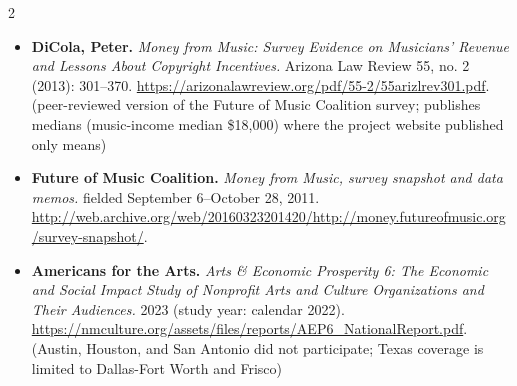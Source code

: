 {\begin{multicols}{2}
\begin{itemize}[itemsep=0pt,topsep=1pt,parsep=0pt,partopsep=0pt,leftmargin=1em]
\item \textbf{DiCola, Peter.} \textit{Money from Music: Survey Evidence on Musicians’ Revenue and Lessons About Copyright Incentives.} Arizona Law Review 55, no. 2 (2013): 301--370. \url{https://arizonalawreview.org/pdf/55-2/55arizlrev301.pdf}. {\color{ammuted}(peer-reviewed version of the Future of Music Coalition survey; publishes medians (music-income median \$18,000) where the project website published only means)}
\item \textbf{Future of Music Coalition.} \textit{Money from Music, survey snapshot and data memos.} fielded September 6--October 28, 2011. \url{http://web.archive.org/web/20160323201420/http://money.futureofmusic.org/survey-snapshot/}.
\item \textbf{Americans for the Arts.} \textit{Arts \& Economic Prosperity 6: The Economic and Social Impact Study of Nonprofit Arts and Culture Organizations and Their Audiences.} 2023 (study year: calendar 2022). \url{https://nmculture.org/assets/files/reports/AEP6_NationalReport.pdf}. {\color{ammuted}(Austin, Houston, and San Antonio did not participate; Texas coverage is limited to Dallas-Fort Worth and Frisco)}
\end{itemize}

\end{multicols}}
